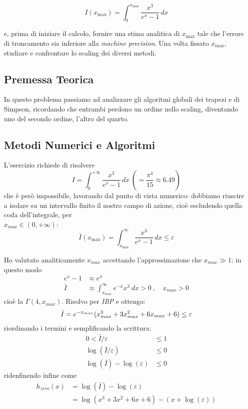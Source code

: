 \begin{equation*}
I(x_{\text{max}}) = \int_{0}^{x_{\text{max}}} \frac{x^3}{e^x - 1} \, dx
\end{equation*}

\noindent e, prima di iniziare il calcolo, fornire una stima analitica di $x_{\text{max}}$ tale che l'errore di troncamento sia inferiore alla \textit{machine precision}. Una volta fissato $x_{\text{max}}$, studiare e confrontare lo scaling dei diversi metodi.


\subsection{Premessa Teorica}
In questo problema passiamo ad analizzare gli algoritmi globali dei trapezi e di Simpson, ricordando che entrambi perdono un ordine nello scaling, diventando uno del secondo ordine, l'altro del quarto.

\subsection{Metodi Numerici e Algoritmi}
L'esercizio richiede di risolvere
\begin{equation*}
I = \int_{0}^{+\infty} \frac{x^3}{e^x - 1} \, dx\ \left ( = \frac{\pi^4}{15} \approx 6.49 \right)
\end{equation*}
che è però impossibile, lavorando dal punto di vista numerico: dobbiamo riuscire a isolare su un intervallo finito il nostro campo di azione, cioè escludendo quella coda dell'integrale, per\\ $x_{max} \in (0, +\infty)$:
$$\bar I(x_{\text{max}}) = \int_{x_{\text{max}}}^{\infty} \frac{x^3}{e^x - 1} \, dx \le \varepsilon $$  

\bigskip\noindent
Ho valutato analiticamente $x_{max}$ accettando l'approssimazione che $x_{max}\gg1$: in questo modo
\begin{align*}
e^x -1 &\approx e^x \\
\bar I &\approx \int_{x_{max}}^\infty e^{-x}x^3\ dx > 0\ , \quad x_{max}>0
\end{align*}
cioè la $\Gamma(4, x_{max})$. Risolvo per \textit{IBP} e ottengo:
\[
    \bar I = e^{-x_{max}}(x_{max}^3 + 3x_{max}^2 + 6x_{max} + 6) \le \varepsilon \\
\]
riordinando i termini e semplificando la scrittura:
\begin{align*}
    0 < \bar I / \varepsilon &\le 1 \\
    \log(\bar I/ \varepsilon) &\le 0\\
    \log(\bar I) - \log(\varepsilon) &\le 0
\end{align*}
ridenfinendo infine come
\begin{align*}
    h_{zero}(x) &= \log(\bar I) - \log(\varepsilon)\\
     &=\log(x^3 + 3x^2 + 6x + 6) -  (x + \log(\varepsilon))\\
\end{align*}

